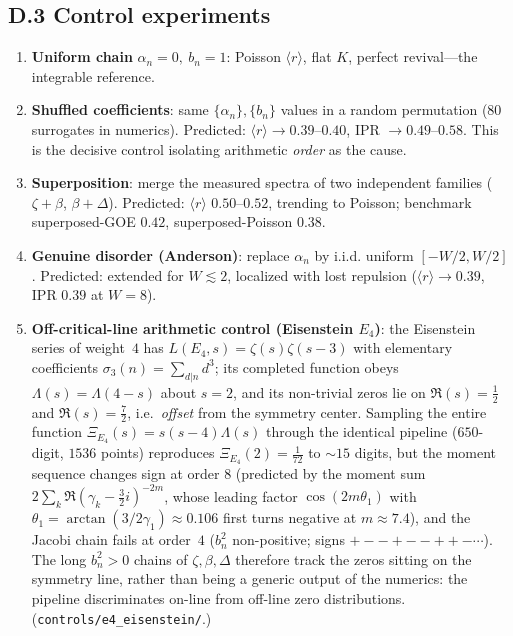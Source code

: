 \documentclass[aps,prx,reprint,floatfix]{revtex4-2}
\begin{document}
\subsection{D.3 Control experiments}
\begin{enumerate}[leftmargin=1.4em]
\item \textbf{Uniform chain} $\alpha_n=0,\ b_n=1$: Poisson $\langle r\rangle$,
flat $K$, perfect revival---the integrable reference.
\item \textbf{Shuffled coefficients}: same $\{\alpha_n\},\{b_n\}$ values in a
random permutation (80 surrogates in numerics). Predicted: $\langle r\rangle\to
0.39$--$0.40$, IPR $\to0.49$--$0.58$. This is the decisive control isolating
arithmetic \emph{order} as the cause.
\item \textbf{Superposition}: merge the measured spectra of two independent
families ($\zeta+\beta$, $\beta+\Delta$). Predicted: $\langle r\rangle$
$0.50$--$0.52$, trending to Poisson; benchmark superposed-GOE $0.42$,
superposed-Poisson $0.38$.
\item \textbf{Genuine disorder (Anderson)}: replace $\alpha_n$ by i.i.d.
uniform $[-W/2,W/2]$. Predicted: extended for $W\lesssim2$, localized with
lost repulsion ($\langle r\rangle\to0.39$, IPR $0.39$ at $W=8$).
\item \textbf{Off-critical-line arithmetic control (Eisenstein $E_4$)}: the
Eisenstein series of weight~$4$ has $L(E_4,s)=\zeta(s)\zeta(s-3)$ with
elementary coefficients $\sigma_3(n)=\sum_{d|n}d^3$; its completed function
obeys $\Lambda(s)=\Lambda(4-s)$ about $s=2$, and its non-trivial zeros lie on
$\Re(s)=\tfrac12$ and $\Re(s)=\tfrac72$, i.e.\ \emph{offset} from the symmetry
center. Sampling the entire function $\Xi_{E_4}(s)=s(s-4)\Lambda(s)$ through
the identical pipeline ($650$-digit, $1536$ points) reproduces
$\Xi_{E_4}(2)=\tfrac1{72}$ to $\sim15$ digits, but the moment sequence changes
sign at order $8$ (predicted by the moment sum
$2\sum_k\Re(\gamma_k-\tfrac32 i)^{-2m}$, whose leading factor
$\cos(2m\theta_1)$ with $\theta_1=\arctan(3/2\gamma_1)\approx0.106$ first turns
negative at $m\approx7.4$), and the Jacobi chain fails at order~$4$ ($b_n^2$
non-positive; signs $+--+--++-\cdots$). The long $b_n^2>0$ chains of
$\zeta,\beta,\Delta$ therefore track the zeros sitting on the symmetry line,
rather than being a generic output of the numerics: the pipeline discriminates
on-line from off-line zero distributions. (\texttt{controls/e4\_eisenstein/}.)
\end{enumerate}
\end{document}

